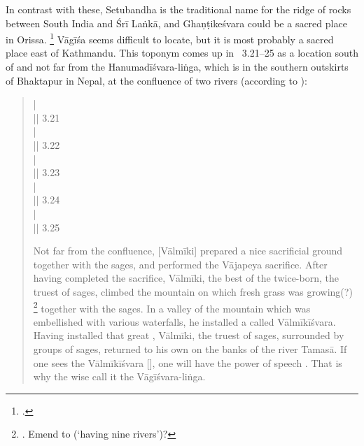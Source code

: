 In contrast with these, Setubandha is the
traditional name for the ridge of rocks between
South India and Śrī Laṅkā, and Ghaṇṭikeśvara could
be a sacred place in Orissa.%
	\footnote{.}
Vāgīśa seems difficult to locate, but it is most probably
a sacred place east of Kathmandu. This toponym comes
up in \NepMah\ 3.21--25 as a location south of and 
not far from the Hanumadīśvara-liṅga,
which is in the southern outskirts of 
Bhaktapur in Nepal, at the confluence
of two rivers (according to 
):

\begin{quote}
 |\\
 || 3.21\\
 |\\
 || 3.22\\
 |\\
 || 3.23\\
 |\\
 || 3.24\\
 |\\
 || 3.25

Not far from the confluence, [Vālmīki] prepared a nice
sacrificial ground together with the sages, and 
performed the Vājapeya sacrifice. After having
completed the sacrifice, Vālmīki, the best of
the twice-born, the truest of sages, climbed 
the mountain on which fresh grass was growing(?)%
	\footnote{. Emend to 
	 (`having nine rivers')?}
together with the sages. In a valley of the mountain
which was embellished with various waterfalls, he
installed a  called Vālmīkīśvara. Having 
installed that great , Vālmīki, the truest of
sages, surrounded by groups of sages,
returned to his own  on the banks
of the river Tamasā. If one sees the Vālmīkīśvara [],
one will have the power of speech . 
That is why the wise call it the Vāgīśvara-liṅga.
\end{quote}


